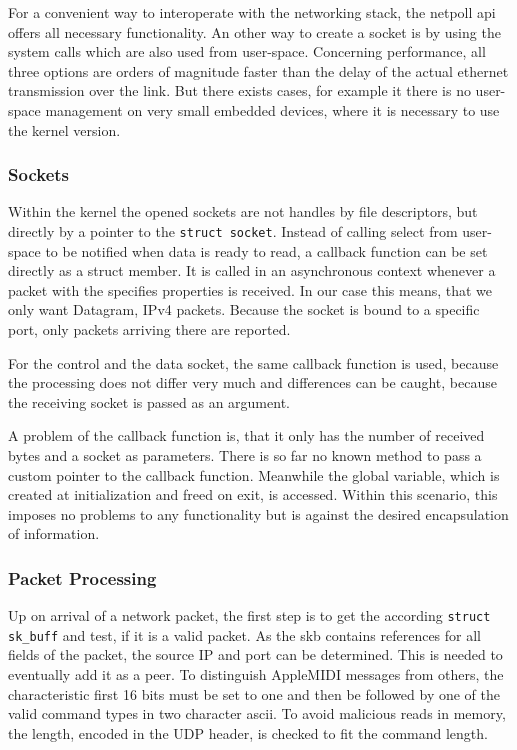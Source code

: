 \documentclass[paper=a4,fontsize=11pt,pagesize,bibtotoc]{scrartcl}
\begin{document}
	For a convenient way to interoperate with the networking stack, the netpoll api offers all necessary functionality. An other way to create a socket is by using the system calls which are also used from user-space. Concerning performance, all three options are orders of magnitude faster than the delay of the actual ethernet transmission over the link. But there exists cases, for example it there is no user-space management on very small embedded devices, where it is necessary to use the kernel version.
	
	\subsubsection{Sockets}
	
	Within the kernel the opened sockets are not handles by file descriptors, but directly by a pointer to the \texttt{struct socket}. Instead of calling select from user-space to be notified when data is ready to read, a callback function can be set directly as a struct member. It is called in an asynchronous context whenever a packet with the specifies properties is received. In our case this means, that we only want Datagram, IPv4 packets. Because the socket is bound to a specific port, only packets arriving there are reported.
	
	For the control and the data socket, the same callback function is used, because the processing does not differ very much and differences can be caught, because the receiving socket is passed as an argument.
	
	A problem of the callback function is, that it only has the number of received bytes and a socket as parameters. There is so far no known method to pass a custom pointer to the callback function. Meanwhile the global variable, which is created at initialization and freed on exit, is accessed. Within this scenario, this imposes no problems to any functionality but is against the desired encapsulation of information.
	
	\subsubsection{Packet Processing}
	
	Up on arrival of a network packet, the first step is to get the according \texttt{struct sk\_buff} and test, if it is a valid packet. As the skb contains references for all fields of the packet, the source IP and port can be determined. This is needed to eventually add it as a peer. To distinguish AppleMIDI messages from others, the characteristic first 16 bits must be set to one and then be followed by one of the valid command types in two character ascii. To avoid malicious reads in memory, the length, encoded in the UDP header, is checked to fit the command length.
	
\end{document}
